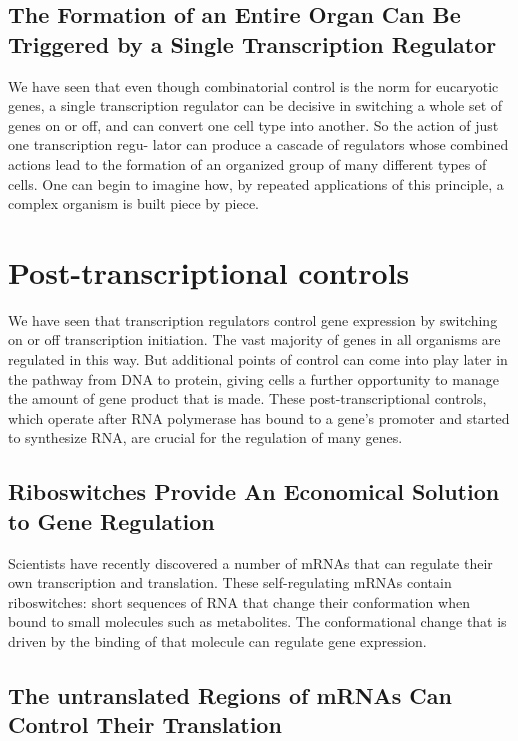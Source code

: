 \subsection{The Formation of an Entire Organ Can Be Triggered by a Single Transcription Regulator}

We have seen that even though combinatorial control is the norm for
eucaryotic genes, a single transcription regulator can be decisive in
switching a whole set of genes on or off, and can convert one cell type
into another. So the action of just one transcription regu-
lator can produce a cascade of regulators whose combined actions lead
to the formation of an organized group of many different types of cells.
One can begin to imagine how, by repeated applications of this principle,
a complex organism is built piece by piece.

\section{Post-transcriptional controls}

We have seen that transcription regulators control gene expression by
switching on or off transcription initiation. The vast majority of genes
in all organisms are regulated in this way. But additional points of control 
can come into play later in the pathway from DNA to protein, giving
cells a further opportunity to manage the amount of gene product that
is made. These post-transcriptional controls, which operate after RNA
polymerase has bound to a gene’s promoter and started to synthesize
RNA, are crucial for the regulation of many genes.

\subsection{Riboswitches Provide An Economical Solution to Gene Regulation}

Scientists have recently discovered a number of mRNAs that can regulate their
own transcription and translation. These self-regulating mRNAs contain
riboswitches: short sequences of RNA that change their conformation
when bound to small molecules such as metabolites.
The conformational change that is driven by the binding of that molecule
can regulate gene expression.

\subsection{The untranslated Regions of mRNAs Can Control Their Translation}

